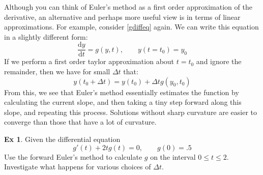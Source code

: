 \documentclass[]{article}
\theoremstyle{definition}
\newtheorem{exmp}{Ex}[section]
\numberwithin{equation}{section}
\begin{document}
	Although you can think of Euler's method as a first order approximation of the derivative, an alternative and perhaps more useful view is in terms of linear approximations. For example, consider \eqref{gdiffeq} again. We can write this equation in a slightly different form:
	\begin{equation*}
		\frac{\text{d}y}{\text{d}t} = g(y,t), \qquad y(t=t_0) = y_0
	\end{equation*}
	If we perform a first order taylor approximation about $t=t_0$ and ignore the remainder, then we have for small $\Delta t$ that:
	\[
	y(t_0 + \Delta t) = y(t_0) + \Delta t g(y_0,t_0)
	\]
	From this, we see that Euler's method essentially estimates the function by calculating the current slope, and then taking a tiny step forward along this slope, and repeating this process. Solutions without sharp curvature are easier to converge than those that have a lot of curvature.
	\begin{exmp}
		Given the differential equation 
		\[
		g'(t) + 2tg(t) = 0, \qquad g(0) = .5
		\]
		Use the forward Euler's method to calculate $g$ on the interval $ 0 \leq t \leq 2$. Investigate what happens for various choices of $\Delta t$.\\
	\end{exmp}	
	
\end{document}
